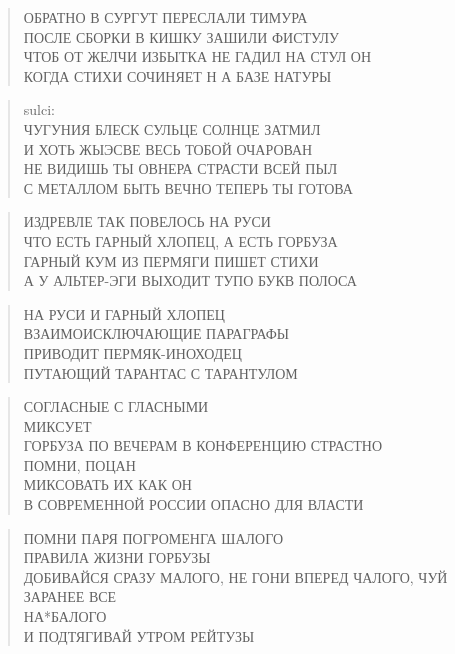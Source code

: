 \poemtitle{***}
\begin{verse}
ОБРАТНО В СУРГУТ ПЕРЕСЛАЛИ ТИМУРА\\
ПОСЛЕ СБОРКИ В КИШКУ ЗАШИЛИ ФИСТУЛУ\\
ЧТОБ ОТ ЖЕЛЧИ ИЗБЫТКА НЕ ГАДИЛ НА СТУЛ ОН\\
КОГДА СТИХИ СОЧИНЯЕТ Н А БАЗЕ НАТУРЫ
\end{verse}

\poemtitle{***}
\begin{verse}
sulci:\\
ЧУГУНИЯ БЛЕСК СУЛЬЦЕ СОЛНЦЕ ЗАТМИЛ\\
И ХОТЬ ЖЫЭСВЕ ВЕСЬ ТОБОЙ ОЧАРОВАН\\
НЕ ВИДИШЬ ТЫ ОВНЕРА СТРАСТИ ВСЕЙ ПЫЛ\\
С МЕТАЛЛОМ БЫТЬ ВЕЧНО ТЕПЕРЬ ТЫ ГОТОВА
\end{verse}

\poemtitle{***}
\begin{verse}
ИЗДРЕВЛЕ ТАК  ПОВЕЛОСЬ НА РУСИ\\
ЧТО ЕСТЬ ГАРНЫЙ ХЛОПЕЦ, А ЕСТЬ ГОРБУЗА\\
ГАРНЫЙ КУМ ИЗ ПЕРМЯГИ ПИШЕТ СТИХИ\\
А У АЛЬТЕР-ЭГИ ВЫХОДИТ ТУПО БУКВ ПОЛОСА
\end{verse}

\poemtitle{***}
\begin{verse}
НА РУСИ И ГАРНЫЙ ХЛОПЕЦ\\
ВЗАИМОИСКЛЮЧАЮЩИЕ ПАРАГРАФЫ\\
ПРИВОДИТ ПЕРМЯК-ИНОХОДЕЦ\\
ПУТАЮЩИЙ ТАРАНТАС С ТАРАНТУЛОМ
\end{verse}

\poemtitle{***}
\begin{verse}
СОГЛАСНЫЕ С ГЛАСНЫМИ \\
  МИКСУЕТ  \\
    ГОРБУЗА ПО ВЕЧЕРАМ В КОНФЕРЕНЦИЮ СТРАСТНО\\
ПОМНИ, ПОЦАН\\
  МИКСОВАТЬ ИХ КАК ОН\\
    В СОВРЕМЕННОЙ РОССИИ ОПАСНО ДЛЯ ВЛАСТИ
\end{verse}

\poemtitle{***}
\begin{verse}
ПОМНИ ПАРЯ ПОГРОМЕНГА ШАЛОГО\\
ПРАВИЛА ЖИЗНИ ГОРБУЗЫ\\
ДОБИВАЙСЯ СРАЗУ МАЛОГО, НЕ ГОНИ ВПЕРЕД ЧАЛОГО, ЧУЙ ЗАРАНЕЕ ВСЕ\\
НА*БАЛОГО\\
И ПОДТЯГИВАЙ УТРОМ РЕЙТУЗЫ
\end{verse}

